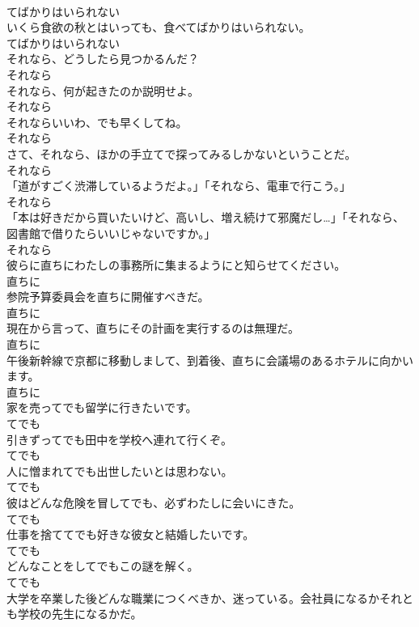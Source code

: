 \documentclass[8pt]{extreport}
\begin{document}
\begin{CJK}{UTF8}{min}
\\	てばかりはいられない
\\	いくら食欲の秋とはいっても、食べてばかりはいられない。	
\\	てばかりはいられない
\\	それなら、どうしたら見つかるんだ？	
\\	それなら
\\	それなら、何が起きたのか説明せよ。	
\\	それなら
\\	それならいいわ、でも早くしてね。	
\\	それなら
\\	さて、それなら、ほかの手立てで探ってみるしかないということだ。	
\\	それなら
\\	「道がすごく渋滞しているようだよ。」「それなら、電車で行こう。」	
\\	それなら
\\	「本は好きだから買いたいけど、高いし、増え続けて邪魔だし…」「それなら、図書館で借りたらいいじゃないですか。」	
\\	それなら
\\	彼らに直ちにわたしの事務所に集まるようにと知らせてください。	
\\	直ちに
\\	参院予算委員会を直ちに開催すべきだ。	
\\	直ちに
\\	現在から言って、直ちにその計画を実行するのは無理だ。	
\\	直ちに
\\	午後新幹線で京都に移動しまして、到着後、直ちに会議場のあるホテルに向かいます。	
\\	直ちに
\\	家を売ってでも留学に行きたいです。	
\\	てでも
\\	引きずってでも田中を学校へ連れて行くぞ。	
\\	てでも
\\	人に憎まれてでも出世したいとは思わない。	
\\	てでも
\\	彼はどんな危険を冒してでも、必ずわたしに会いにきた。	
\\	てでも
\\	仕事を捨ててでも好きな彼女と結婚したいです。	
\\	てでも
\\	どんなことをしてでもこの謎を解く。	
\\	てでも
\\	大学を卒業した後どんな職業につくべきか、迷っている。会社員になるかそれとも学校の先生になるかだ。	

\end{CJK}
\end{document}
